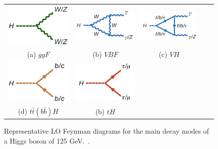 \documentclass[11pt,twoside]{book}
\begin{document}
\begin{figure}
\begin{center}
\begin{tabular}{ccc|cc}
\centering
\includegraphics[width=0.3\linewidth,H]{images/HVV.png}  &
\includegraphics[width=0.3\linewidth,H]{images/Hgg.png}  &
\includegraphics[width=0.3\linewidth,H]{images/Hgg_loop.png} \\
(a) $ggF$ & (b) $VBF$ & (c) $VH$ \\
\includegraphics[width=0.3\linewidth,H]{images/Hbb.png} &
\includegraphics[width=0.3\linewidth,H]{images/Htt.png} \\
(d) $t\bar{t}(b\bar{b})H$ & (b) $tH$ \\

\end{tabular}
\caption{\label{coupl}
Representative LO Feynman diagrams for the main decay modes of a Higgs boson of 125 GeV.~\cite{NATURE}.
}
\end{center}
\end{figure}
\end{document}
